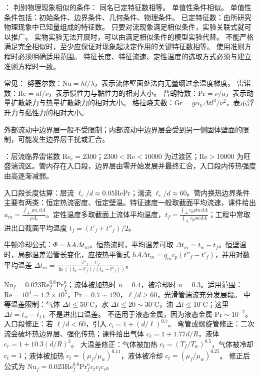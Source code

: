 ：
判别物理现象相似的条件：
同名已定特征数相等。
单值性条件相似。
单值性条件包括：初始条件、边界条件、几何条件、物理条件。
已定特征数：由所研究物理现象中已知量组成的特征数。
只要对流现象满足相似条件，实验关联式就可以推广。
实物实验无法开展时，可以由满足相似条件的模型实验代替。
不能严格满足完全相似时，至少应保证对现象起决定作用的关键特征数相等。
使用准则方程时必须明确适用范围。
特征长度、特征流速、定性温度的选取方式必须与建立准则方程时一致。

常见：
努塞尔数：$\mathrm{Nu}=hl/\lambda$，表示流体壁面处法向无量纲过余温度梯度。
雷诺数：$\mathrm{Re}=ul/\nu$，表示惯性力与黏性力的相对大小。
普朗特数：$\mathrm{Pr}=\nu/a$，表示动量扩散能力与热量扩散能力的相对大小。
格拉晓夫数：$\mathrm{Gr}=g\alpha_V\Delta t l^3/\nu^2$，表示浮升力与黏性力的相对大小。

\divider



外部流动中边界层一般不受限制；内部流动中边界层会受到另一侧固体壁面的限制，可能发生边界层干扰或汇合。

：层流临界雷诺数 $\mathrm{Re}_c=2300$；$2300<\mathrm{Re}<10000$ 为过渡区；$\mathrm{Re}>10000$ 为旺盛湍流区。管内存在入口段，边界层由零开始发展并最终汇合，入口段内传热强度由高逐渐减弱。

入口段长度估算：层流 $\ell_e/d\approx0.05\mathrm{Re}\mathrm{Pr}$；湍流 $\ell_e/d\approx60$。管内换热边界条件主要有两类：恒定热流密度、恒定壁温。特征速度一般取截面平均流速，课件给出 $u_m=\frac{\int_{A_c}\rho u,\mathrm{d}A}{\rho A_c}$。定性温度多取截面上流体平均温度，$t_f=\frac{\int_{A_c}c_p\rho tu\,\mathrm{d}A}{\int_{A_c}c_p\rho u\,\mathrm{d}A}$；工程中常取进出口截面平均温度 $t_f=(t'_f+t''_f)/2$。

牛顿冷却公式：$\Phi=hA\Delta t_m$。恒热流时，平均温差可取 $\Delta t_m=t_w-t_f$。恒壁温时，局部温差沿管长变化，应按热平衡式 $hA\Delta t_m=q_m c_p(t''_f-t'_f)$，并用对数平均温差 $\Delta t_m=\frac{t''_f-t'_f}{\ln((t_w-t'_f)/(t_w-t''_f))}$。

 $\mathrm{Nu}_f=0.023\mathrm{Re}_f^{0.8}\mathrm{Pr}_f^n$；流体被加热时 $n=0.4$，被冷却时 $n=0.3$。适用范围：$\mathrm{Re}=10^4\sim1.2\times10^5$，$\mathrm{Pr}=0.7\sim120$，$\ell/d\ge60$，光滑管湍流充分发展段。
中等温差限制：气体 $\Delta t\le50^\circ\mathrm{C}$，水 $\Delta t\le20\sim30^\circ\mathrm{C}$，油 $\Delta t\le10^\circ\mathrm{C}$；这里 $\Delta t=t_w-t_f$，不是进出口温差。
不适用于液态金属，因为液态金属 $\mathrm{Pr}\sim10^{-2}$。
入口段修正：若 $\ell/d<60$，引入 $c_l=1+(d/\ell)^{0.7}$。
弯管或螺旋管修正：二次流会破坏热边界层、强化传热；课件给出气体 $c_r=1+1.77d/R$，液体 $c_r=1+10.3(d/R)^3$。
大温差修正：气体被加热 $c_t=(T_f/T_w)^{0.5}$，气体被冷却 $c_t=1$；液体被加热 $c_t=(\mu_f/\mu_w)^{0.11}$，液体被冷却 $c_t=(\mu_f/\mu_w)^{0.25}$。
修正后公式为 $\mathrm{Nu}_f=0.023\mathrm{Re}_f^{0.8}\mathrm{Pr}_f^n c_t c_l c_r$。

